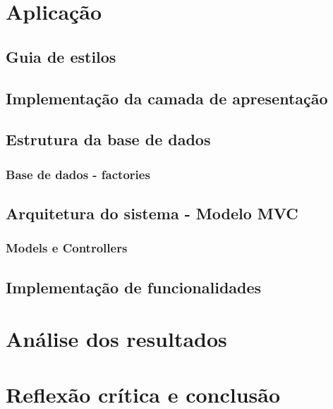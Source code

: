 \documentclass[11pt, twoside]{report}
\begin{document}
	\chapter{Aplicação}
	\section{Guia de estilos}
	\section{Implementação da camada de apresentação}
	\section{Estrutura da base de dados}
	\subsection{Base de dados - factories}
	\section{Arquitetura do sistema - Modelo MVC}
	\subsection{Models e Controllers}
	\section{Implementação de funcionalidades}
	\chapter{Análise dos resultados}
	\chapter{Reflexão crítica e conclusão}
	
	

	
	
	
	
\end{document}
